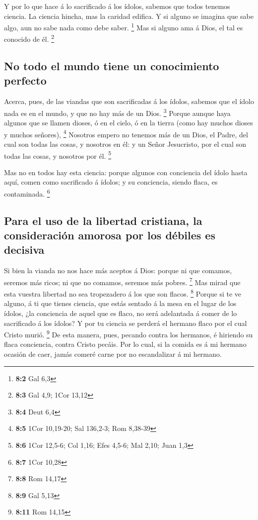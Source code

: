  Y por lo que hace á lo sacrificado á los ídolos, sabemos
que todos tenemos ciencia. La ciencia hincha, mas la caridad edifica.
 Y si alguno se imagina que sabe algo, aun no sabe nada
como debe saber. \footnote{\textbf{8:2} Gal 6,3}  Mas si
alguno ama á Dios, el tal es conocido de él. \footnote{\textbf{8:3} Gal
  4,9; 1Cor 13,12}

\hypertarget{no-todo-el-mundo-tiene-un-conocimiento-perfecto}{%
\subsection{No todo el mundo tiene un conocimiento
perfecto}\label{no-todo-el-mundo-tiene-un-conocimiento-perfecto}}

 Acerca, pues, de las viandas que son sacrificadas á los
ídolos, sabemos que el ídolo nada es en el mundo, y que no hay más de un
Dios. \footnote{\textbf{8:4} Deut 6,4}  Porque aunque haya
algunos que se llamen dioses, ó en el cielo, ó en la tierra (como hay
muchos dioses y muchos señores), \footnote{\textbf{8:5} 1Cor 10,19-20;
  Sal 136,2-3; Rom 8,38-39}  Nosotros empero no tenemos
más de un Dios, el Padre, del cual son todas las cosas, y nosotros en
él: y un Señor Jesucristo, por el cual son todas las cosas, y nosotros
por él. \footnote{\textbf{8:6} 1Cor 12,5-6; Col 1,16; Efes 4,5-6; Mal
  2,10; Juan 1,3}

 Mas no en todos hay esta ciencia: porque algunos con
conciencia del ídolo hasta aquí, comen como sacrificado á ídolos; y su
conciencia, siendo flaca, es contaminada. \footnote{\textbf{8:7} 1Cor
  10,28}

\hypertarget{para-el-uso-de-la-libertad-cristiana-la-consideraciuxf3n-amorosa-por-los-duxe9biles-es-decisiva}{%
\subsection{Para el uso de la libertad cristiana, la consideración
amorosa por los débiles es
decisiva}\label{para-el-uso-de-la-libertad-cristiana-la-consideraciuxf3n-amorosa-por-los-duxe9biles-es-decisiva}}

 Si bien la vianda no nos hace más aceptos á Dios: porque
ni que comamos, seremos más ricos; ni que no comamos, seremos más
pobres. \footnote{\textbf{8:8} Rom 14,17}  Mas mirad que
esta vuestra libertad no sea tropezadero á los que son flacos.
\footnote{\textbf{8:9} Gal 5,13}  Porque si te ve alguno,
á ti que tienes ciencia, que estás sentado á la mesa en el lugar de los
ídolos, ¿la conciencia de aquel que es flaco, no será adelantada á comer
de lo sacrificado á los ídolos?  Y por tu ciencia se
perderá el hermano flaco por el cual Cristo murió. \footnote{\textbf{8:11}
  Rom 14,15}  De esta manera, pues, pecando contra los
hermanos, é hiriendo su flaca conciencia, contra Cristo pecáis.
 Por lo cual, si la comida es á mi hermano ocasión de
caer, jamás comeré carne por no escandalizar á mi hermano.

